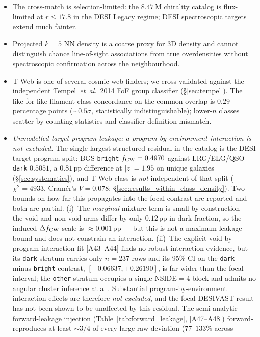 \documentclass[twocolumn,linenumbers]{aastex702}
\begin{document}
\begin{itemize}
\item The cross-match is selection-limited: the $8.47$\,M chirality
catalog is flux-limited at $r\!\le\!17.8$ in the DESI Legacy regime;
DESI spectroscopic targets extend much fainter.
\item Projected $k\!=\!5$ NN density is a coarse proxy for 3D density
and cannot distinguish chance line-of-sight associations from true
overdensities without spectroscopic confirmation across the
neighbourhood.
\item T-Web is one of several cosmic-web finders; we cross-validated
against the independent Tempel~\textit{et~al.}~2014 \cite{Tempel2014}
FoF group classifier (\S\ref{sec:tempel}). The like-for-like filament
class
concordance on the common overlap is $0.29$\,percentage points
(${\sim}0.5\sigma$, statistically indistinguishable); lower-$n$
classes scatter by counting statistics and
classifier-definition mismatch.
\item \emph{Unmodelled target-program leakage; a program-by-environment
interaction is not excluded.} The single largest structured residual in
the catalog is the DESI target-program split: BGS-\texttt{bright}
$f_{\rm CW} = 0.4970$ against LRG/ELG/QSO-\texttt{dark} $0.5051$, a
$0.81$\,pp difference at $|z| = 1.95$ on unique galaxies
(\S\ref{sec:systematics}), and T-Web class is \emph{not} independent of
that split ($\chi^{2} = 4933$, Cram\'er's $V = 0.078$;
\S\ref{sec:results_within_class_density}). Two bounds on how far this
propagates into the focal contrast are reported and both are partial.
(i)~The \emph{marginal}-mixture term is small by construction --- the
void and non-void arms differ by only $0.12$\,pp in dark fraction, so
the induced $\Delta f_{\rm CW}$ scale is ${\approx}0.001$\,pp --- but
this is not a maximum leakage bound and does not constrain an
interaction. (ii)~The explicit void-by-program interaction fit
[A43--A44] finds no robust interaction evidence, but its \texttt{dark}
stratum carries only $n = 237$ rows and its 95\% CI on the
\texttt{dark}-minus-\texttt{bright} contrast,
$[-0.06637,+0.26190]$, is far wider than the focal interval; the
\texttt{other} stratum occupies a single NSIDE$=4$ block and admits no
angular cluster inference at all. Substantial program-by-environment
interaction effects are therefore \emph{not excluded}, and the focal
DESIVAST result has not been shown to be unaffected by this residual.
The semi-analytic forward-leakage injection
(Table~\ref{tab:forward_leakage}, [A47--A48]) forward-reproduces at
least ${\sim}3/4$ of every large raw deviation ($77$--$133\%$ across

\end{itemize}
\end{document}
